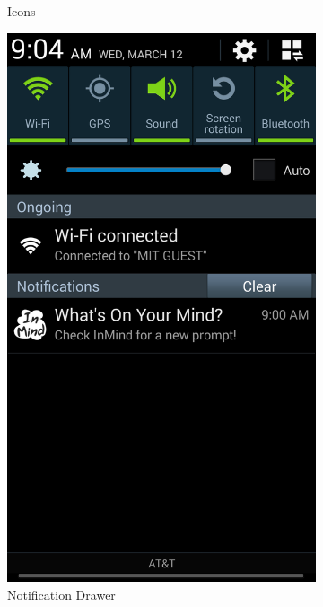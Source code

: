 \begin{figure}
\begin{subfigure}[b]{0.3\textwidth}
         \caption{Icons}
      \end{subfigure}
      \begin{subfigure}[b]{0.3\textwidth}
        \includegraphics[width=\textwidth]{notification.png}
        \caption{Notification Drawer}
      \end{subfigure}
      \begin{subfigure}[b]{0.3\textwidth}

\end{subfigure}
\end{figure}
